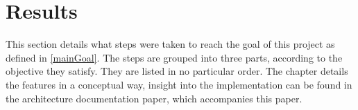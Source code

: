 \section{Results}
This section details what steps were taken to reach the goal of this project as defined in \ref{mainGoal}. The steps are grouped into three parts, according to the objective they satisfy. They are listed in no particular order. The chapter details the features in a conceptual way, insight into the implementation can be found in the architecture documentation paper, which accompanies this paper. 



